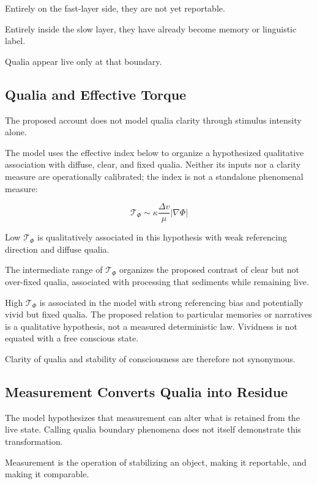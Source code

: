 Entirely on the fast-layer side, they are not yet reportable.

Entirely inside the slow layer, they have already become memory or linguistic label.

Qualia appear live only at that boundary.

\subsection{Qualia and Effective Torque}


The proposed account does not model qualia clarity through stimulus intensity alone.

The model uses the effective index below to organize a hypothesized qualitative association with diffuse, clear, and fixed qualia. Neither its inputs nor a clarity measure are operationally calibrated; the index is not a standalone phenomenal measure:

\begin{equation}
\mathcal{T}_{\Phi} \sim \kappa \frac{\Delta v}{\mu} |\nabla \Phi|
\end{equation}

Low $\mathcal{T}_{\Phi}$ is qualitatively associated in this hypothesis with weak referencing direction and diffuse qualia.

The intermediate range of $\mathcal{T}_{\Phi}$ organizes the proposed contrast of clear but not over-fixed qualia, associated with processing that sediments while remaining live.

High $\mathcal{T}_{\Phi}$ is associated in the model with strong referencing bias and potentially vivid but fixed qualia. The proposed relation to particular memories or narratives is a qualitative hypothesis, not a measured deterministic law. Vividness is not equated with a free conscious state.

Clarity of qualia and stability of consciousness are therefore not synonymous.

\subsection{Measurement Converts Qualia into Residue}


The model hypothesizes that measurement can alter what is retained from the live state. Calling qualia boundary phenomena does not itself demonstrate this transformation.

Measurement is the operation of stabilizing an object, making it reportable, and making it comparable.

